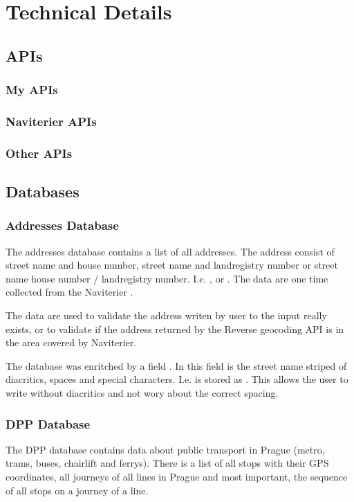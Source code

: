\documentclass[11pt,oneside,a4paper]{book}
\begin{document}
	\section{Technical Details}
	\subsection{APIs}
	\subsubsection{My APIs}
	\subsubsection{Naviterier APIs}
	\subsubsection{Other APIs}
	\subsection{Databases}
	\subsubsection{Addresses Database}
	The addresses database contains a list of all addresses. The address consist of street name and house number, street name nad landregistry number or street name house number / landregistry number. I.e. ,  or .
	The data are one time collected from the Naviterier  \cite{naviterier-addresses}.
	
	The data are used to validate the address writen by user to the input really exists, or to validate if the address returned by the Reverse geocoding API is in the area covered by Naviterier.
	
	The database was enritched by a field . In this field is the street name striped of diacritics, spaces and special characters. I.e.  is stored as . This allows the user to write without diacritics and not wory about the correct spacing.
	
	\subsubsection{DPP Database}
	The DPP database contains data about public transport in Prague (metro, trams, buses, chairlift and ferrys). 
	There is a list of all stops with their GPS coordinates, all journeys of all lines in Prague and most important, the sequence of all stops on a journey of a line.
	
\end{document}
